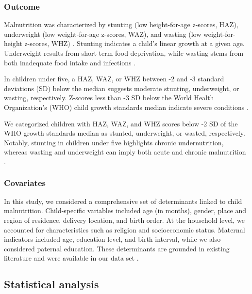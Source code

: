 \documentclass[sn-basic,Numbered,pdflatex]{sn-jnl}
\theoremstyle{remark}
\theoremstyle{definition}
\begin{document}
\hypertarget{outcome}{%
\subsubsection{Outcome}\label{outcome}}

Malnutrition was characterized by stunting (low height-for-age z-scores,
HAZ), underweight (low weight-for-age z-scores, WAZ), and wasting (low
weight-for-height z-scores, WHZ) \citep{kien_trends_2016, jonah2018}.
Stunting indicates a child's linear growth at a given age. Underweight
results from short-term food deprivation, while wasting stems from both
inadequate food intake and infections \citep{jonah2018}.

In children under five, a HAZ, WAZ, or WHZ between -2 and -3 standard
deviations (SD) below the median suggests moderate stunting,
underweight, or wasting, respectively. Z-scores less than -3 SD below
the World Health Organization's (WHO) child growth standards median
indicate severe conditions \citep{WHO2010}.

We categorized children with HAZ, WAZ, and WHZ scores below -2 SD of the
WHO growth standards median as stunted, underweight, or wasted,
respectively. Notably, stunting in children under five highlights
chronic undernutrition, whereas wasting and underweight can imply both
acute and chronic malnutrition \citep{kien_trends_2016}.

\hypertarget{covariates}{%
\subsubsection{Covariates}\label{covariates}}

In this study, we considered a comprehensive set of determinants linked
to child malnutrition. Child-specific variables included age (in
months), gender, place and region of residence, delivery location, and
birth order. At the household level, we accounted for characteristics
such as religion and socioeconomic status. Maternal indicators included
age, education level, and birth interval, while we also considered
paternal education. These determinants are grounded in existing
literature and were available in our data set
\citep{jonah2018, kien_trends_2016, Farah2019}.

\hypertarget{statistical-analysis}{%
\subsection{Statistical analysis}\label{statistical-analysis}}
\end{document}

